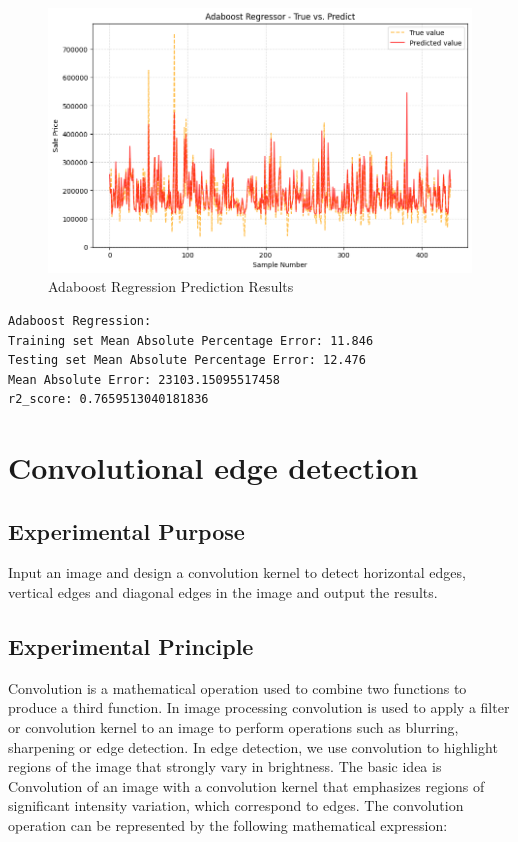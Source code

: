 \documentclass[a4paper,12pt]{article}
\begin{document}
\begin{figure}[H]
    \centering
    \includegraphics[width=0.75\linewidth]{images/kaggle_Adaboost.png}
    \caption{Adaboost Regression Prediction Results}
\end{figure}

\begin{lstlisting}
Adaboost Regression:
Training set Mean Absolute Percentage Error: 11.846
Testing set Mean Absolute Percentage Error: 12.476
Mean Absolute Error: 23103.15095517458
r2_score: 0.7659513040181836
\end{lstlisting}

\newpage
\section{Convolutional edge detection}
\subsection{Experimental Purpose}
Input an image and design a convolution kernel to detect horizontal edges, vertical edges and diagonal edges in the image and output the results.
\subsection{Experimental Principle}
Convolution is a mathematical operation used to combine two functions to produce a third function. In image processing
convolution is used to apply a filter or convolution kernel to an image to perform operations such as blurring, sharpening or edge detection.
In edge detection, we use convolution to highlight regions of the image that strongly vary in brightness. The basic idea is
Convolution of an image with a convolution kernel that emphasizes regions of significant intensity variation, which correspond to edges.
The convolution operation can be represented by the following mathematical expression:
\end{document}
